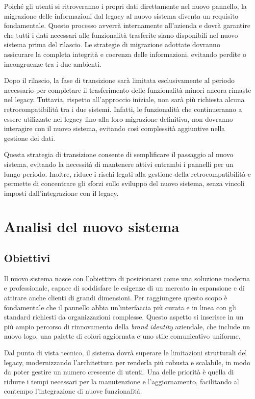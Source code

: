 Poiché gli utenti si ritroveranno i propri dati direttamente nel nuovo pannello, la migrazione delle informazioni dal legacy al nuovo sistema diventa un requisito fondamentale. Questo processo avverrà internamente all’azienda e dovrà garantire che tutti i dati necessari alle funzionalità trasferite siano disponibili nel nuovo sistema prima del rilascio. Le strategie di migrazione adottate dovranno assicurare la completa integrità e coerenza delle informazioni, evitando perdite o incongruenze tra i due ambienti.

Dopo il rilascio, la fase di transizione sarà limitata esclusivamente al periodo necessario per completare il trasferimento delle funzionalità minori ancora rimaste nel legacy. Tuttavia, rispetto all'approccio iniziale, non sarà più richiesta alcuna retrocompatibilità tra i due sistemi. Infatti, le funzionalità che continueranno a essere utilizzate nel legacy fino alla loro migrazione definitiva, non dovranno interagire con il nuovo sistema, evitando così complessità aggiuntive nella gestione dei dati.

Questa strategia di transizione consente di semplificare il passaggio al nuovo sistema, evitando la necessità di mantenere attivi entrambi i pannelli per un lungo periodo. Inoltre, riduce i rischi legati alla gestione della retrocompatibilità e permette di concentrare gli sforzi sullo sviluppo del nuovo sistema, senza vincoli imposti dall’integrazione con il legacy.

\section{Analisi del nuovo sistema}
\subsection{Obiettivi}
Il nuovo sistema nasce con l'obiettivo di posizionarsi come una soluzione moderna e professionale, capace di soddisfare le esigenze di un mercato in espansione e di attirare anche clienti di grandi dimensioni. Per raggiungere questo scopo è fondamentale che il pannello abbia un'interfaccia più curata e in linea con gli standard richiesti da organizzazioni complesse. Questo aspetto si inserisce in un più ampio percorso di rinnovamento della \textit{brand identity} aziendale, che include un nuovo logo, una palette di colori aggiornata e uno stile comunicativo uniforme.

Dal punto di vista tecnico, il sistema dovrà superare le limitazioni strutturali del legacy, modernizzando l'architettura per renderla più robusta e scalabile, in modo da poter gestire un numero crescente di utenti. Una delle priorità è quella di ridurre i tempi necessari per la manutenzione e l’aggiornamento, facilitando al contempo l’integrazione di nuove funzionalità.

